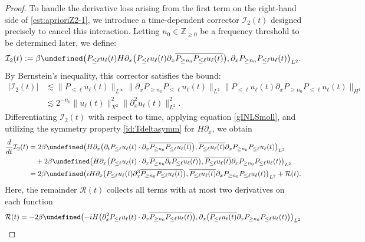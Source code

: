 \documentclass{amsart}
\numberwithin{equation}{section}
\newcommand{\Z}{\mathbb{Z}}
\let\Re=\undefined\DeclareMathOperator{\Re}{Re}
\begin{document}
\begin{proof}
\medskip
To handle the derivative loss arising from the first term on the right-hand side of \eqref{est:aprioriZ2-1}, we introduce a time-dependent corrector $\mathcal{I}_2(t)$ designed precisely to cancel this interaction. Letting $n_0\in \Z_{\geq 0}$ be a frequency threshold to be determined later, we define:
\begin{equation}\label{def:I2}
\mathcal{I}_2(t):=\beta\Re \big( P_{\leq \ell}u_\ell(t)H\partial_x\big(P_{\leq \ell}u_\ell(t)\partial_x\overline{P_{\geq n_0}P_{\leq \ell}u_\ell(t)}\big) ,\partial_xP_{\geq n_0}P_{\leq \ell}u_\ell(t)\big)_{L^2} .
\end{equation}
By Bernstein's inequality, this corrector satisfies the bound:
\begin{equation}\label{bd:I2}
\begin{aligned}
|\mathcal{I}_2(t)|
&\lesssim \| P_{\leq \ell}u_\ell(t) \|_{L^\infty}\| \partial_xP_{\geq n_0}P_{\leq \ell}u_\ell(t) \|_{L^2} \| P_{\leq \ell}u_\ell(t)\partial_xP_{\geq n_0}P_{\leq \ell}u_\ell(t) \|_{H^1} \\
&\lesssim 2^{-n_0}\| u_\ell(t) \|_{X^2}^2\| \partial_x^2u_\ell(t) \|_{L^2}^2.
\end{aligned}
\end{equation}
Differentiating $\mathcal{I}_2(t)$ with respect to time, applying equation \eqref{gINLSmoll}, and utilizing the symmetry property \eqref{id:Tdeltasymm} for $H\partial_x$, we obtain
$$
    \begin{aligned}
    \frac{d}{dt}\mathcal{I}_2(t)&=2\beta \Re \big( H\partial_x\big(\partial_tP_{\leq \ell}u_\ell(t)\cdot \partial_x\overline{P_{\geq n_0}P_{\leq \ell}u_\ell(t)}\big) ,\overline{P_{\leq \ell}u_\ell(t)}\partial_xP_{\geq n_0}P_{\leq \ell}u_\ell(t)\big)_{L^2} \\
    &\quad +2\beta \Re \big( H\partial_x\big(P_{\leq \ell}u_\ell(t)\cdot \partial_x\overline{P_{\geq n_0}\partial_tP_{\leq \ell}u_\ell(t)}\big) ,\overline{P_{\leq \ell}u_\ell(t)}\partial_xP_{\geq n_0}P_{\leq \ell}u_\ell(t)\big)_{L^2} \\
    &=2\beta \Re \big( iH\partial_x\big(P_{\leq \ell}u_\ell(t) \partial_x^3\overline{P_{\geq n_0}P_{\leq \ell}u_\ell(t)}\big) ,\overline{P_{\leq \ell}u_\ell(t)}\partial_xP_{\geq n_0}P_{\leq \ell}u_\ell(t)\big)_{L^2} +\mathcal{R}(t).
\end{aligned}
$$
Here, the remainder $\mathcal{R}(t)$ collects all terms with at most two derivatives on each function$$\begin{aligned}
    \mathcal{R}(t)&=-2\beta \Re\big(  {-}iH\big(\partial_x^2P_{\leq \ell}u_\ell(t)\cdot \partial_x\overline{P_{\geq n_0}P_{\leq \ell}u_\ell(t)}\big) ,\partial_x\big( \overline{P_{\leq \ell}u_\ell(t)}\partial_xP_{\geq n_0}P_{\leq \ell}u_\ell(t)\big) \big)_{L^2} \\

\end{aligned}$$
\end{proof}
\end{document}

